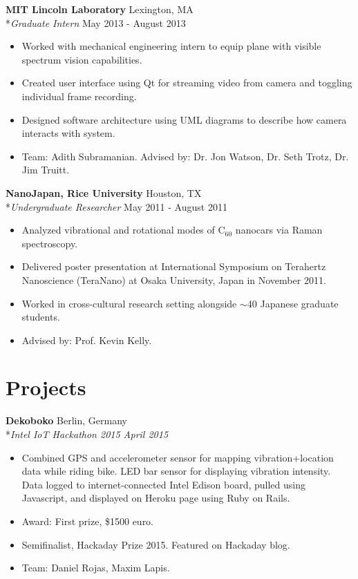 \documentclass{res}
\begin{document}
 {\bf MIT Lincoln Laboratory} \hfill Lexington, MA
    \\*\emph{Graduate Intern} \hfill May 2013 - August 2013
\begin{itemize}
    \item Worked with mechanical engineering intern to equip plane with visible spectrum vision capabilities. 
    \item Created user interface using Qt for streaming video from camera and toggling individual frame recording.
    \item Designed software architecture using UML diagrams to describe how camera interacts with system.
    \item Team: Adith Subramanian. Advised by: Dr. Jon Watson, Dr. Seth Trotz, Dr. Jim Truitt.
\end{itemize}

    {\bf NanoJapan, Rice University} \hfill Houston, TX
    \\*\emph{Undergraduate Researcher} \hfill May 2011 - August 2011
\begin{itemize}
    \item Analyzed vibrational and rotational modes of C$_{60}$ nanocars via Raman spectroscopy.
    \item Delivered poster presentation at International Symposium on Terahertz Nanoscience (TeraNano) at Osaka University, Japan in November 2011.
    \item Worked in cross-cultural research setting alongside $\sim$40 Japanese graduate students.
    \item Advised by: Prof. Kevin Kelly.
\end{itemize}

  




\section{Projects}

{\bf Dekoboko} \hfill Berlin, Germany
\\*\emph{Intel IoT Hackathon 2015 \hfill April 2015}
	\begin{itemize}
		\item Combined GPS and accelerometer sensor for mapping vibration+location data while riding bike. LED bar sensor for displaying vibration intensity. Data logged to internet-connected Intel Edison board, pulled using Javascript, and displayed on Heroku page using Ruby on Rails.
		\item Award: First prize, \$1500 euro. 
		\item Semifinalist, Hackaday Prize 2015. Featured on Hackaday blog.
		\item Team: Daniel Rojas, Maxim Lapis.
	\end{itemize}
	
\end{document}
